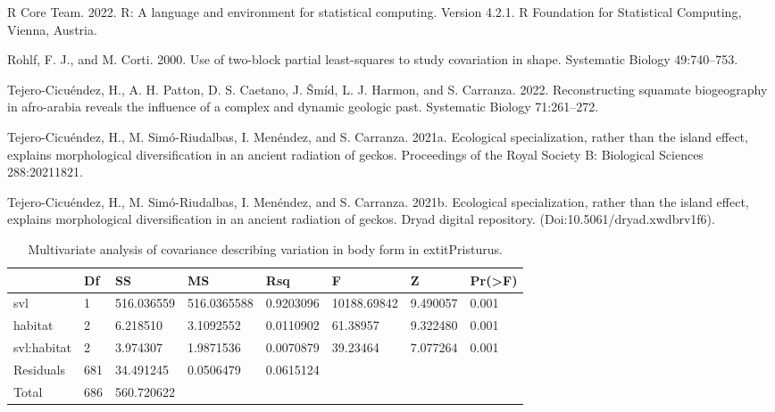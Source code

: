 \documentclass[
]{article}
\begin{document}
\leavevmode\hypertarget{ref-RCT}{}%
R Core Team. 2022. R: A language and environment for statistical
computing. Version 4.2.1. R Foundation for Statistical Computing,
Vienna, Austria.

\leavevmode\hypertarget{ref-Rohlf2000}{}%
Rohlf, F. J., and M. Corti. 2000. Use of two-block partial least-squares
to study covariation in shape. Systematic Biology 49:740--753.

\leavevmode\hypertarget{ref-Tejero-Cicuendez2022}{}%
Tejero-Cicuéndez, H., A. H. Patton, D. S. Caetano, J. Šmíd, L. J.
Harmon, and S. Carranza. 2022. Reconstructing squamate biogeography in
afro-arabia reveals the influence of a complex and dynamic geologic
past. Systematic Biology 71:261--272.

\leavevmode\hypertarget{ref-Tejero-Cicuendez2021}{}%
Tejero-Cicuéndez, H., M. Simó-Riudalbas, I. Menéndez, and S. Carranza.
2021a. Ecological specialization, rather than the island effect,
explains morphological diversification in an ancient radiation of
geckos. Proceedings of the Royal Society B: Biological Sciences
288:20211821.

\leavevmode\hypertarget{ref-PristurusData}{}%
Tejero-Cicuéndez, H., M. Simó-Riudalbas, I. Menéndez, and S. Carranza.
2021b. Ecological specialization, rather than the island effect,
explains morphological diversification in an ancient radiation of
geckos. Dryad digital repository. (Doi:10.5061/dryad.xwdbrv1f6).

\newpage

\begin{table}[H]

\caption{\label{tab:unnamed-chunk-1}Multivariate analysis of covariance describing variation in body form in    extit{Pristurus}.}
\centering
\begin{tabular}[t]{llllllll}
\toprule
  & Df & SS & MS & Rsq & F & Z & Pr(>F)\\
\midrule
svl & 1 & 516.036559 & 516.0365588 & 0.9203096 & 10188.69842 & 9.490057 & 0.001\\
habitat & 2 & 6.218510 & 3.1092552 & 0.0110902 & 61.38957 & 9.322480 & 0.001\\
svl:habitat & 2 & 3.974307 & 1.9871536 & 0.0070879 & 39.23464 & 7.077264 & 0.001\\
Residuals & 681 & 34.491245 & 0.0506479 & 0.0615124 &  &  & \\
Total & 686 & 560.720622 &  &  &  &  & \\
\bottomrule
\end{tabular}
\end{table}
\end{document}

